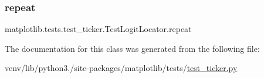 \subsubsection{\texorpdfstring{repeat}{repeat}}
{\footnotesize\ttfamily matplotlib.\+tests.\+test\+\_\+ticker.\+Test\+Logit\+Locator.\+repeat\hspace{0.3cm}{\ttfamily [static]}}



The documentation for this class was generated from the following file\+:\begin{DoxyCompactItemize}
\item 
venv/lib/python3./site-\/packages/matplotlib/tests/\hyperlink{test__ticker_8py}{test\+\_\+ticker.\+py}\end{DoxyCompactItemize}
